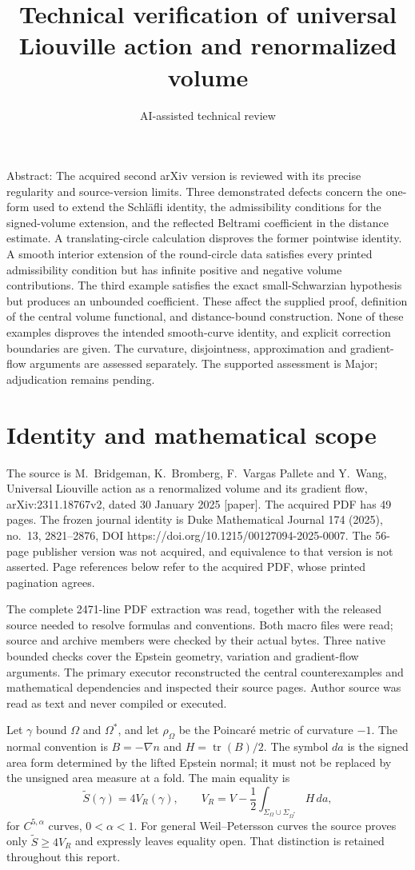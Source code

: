 \documentclass[10pt]{article}
\title{Technical verification of
universal Liouville action and renormalized volume}
\author{AI-assisted technical review}
\date{}
\begin{document}
\maketitle
Abstract: The acquired second arXiv version is reviewed with its precise regularity and source-version limits. Three demonstrated defects concern the one-form used to extend the Schläfli identity, the admissibility conditions for the signed-volume extension, and the reflected Beltrami coefficient in the distance estimate. A translating-circle calculation disproves the former pointwise identity. A smooth interior extension of the round-circle data satisfies every printed admissibility condition but has infinite positive and negative volume contributions. The third example satisfies the exact small-Schwarzian hypothesis but produces an unbounded coefficient. These affect the supplied proof, definition of the central volume functional, and distance-bound construction. None of these examples disproves the intended smooth-curve identity, and explicit correction boundaries are given. The curvature, disjointness, approximation and gradient-flow arguments are assessed separately. The supported assessment is Major; adjudication remains pending.\par
\section*{Identity and mathematical scope}
The source is M. Bridgeman, K. Bromberg, F. Vargas Pallete and Y. Wang, Universal Liouville action as a renormalized volume and its gradient flow, arXiv:2311.18767v2, dated 30 January 2025 [paper]. The acquired PDF has 49 pages. The frozen journal identity is Duke Mathematical Journal 174 (2025), no. 13, 2821–2876, DOI https://doi.org/10.1215/00127094-2025-0007. The 56-page publisher version was not acquired, and equivalence to that version is not asserted. Page references below refer to the acquired PDF, whose printed pagination agrees.\par
The complete 2471-line PDF extraction was read, together with the released source needed to resolve formulas and conventions. Both macro files were read; source and archive members were checked by their actual bytes. Three native bounded checks cover the Epstein geometry, variation and gradient-flow arguments. The primary executor reconstructed the central counterexamples and mathematical dependencies and inspected their source pages. Author source was read as text and never compiled or executed.\par
Let \(\gamma\) bound \(\Omega\) and \(\Omega^*\), and let \(\rho_\Omega\) be the Poincaré metric of curvature \(-1\). The normal convention is \(B=-\nabla n\) and \(H=\operatorname{tr}(B)/2\). The symbol \(da\) is the signed area form determined by the lifted Epstein normal; it must not be replaced by the unsigned area measure at a fold. The main equality is \[\widetilde S(\gamma)=4V_R(\gamma),\qquad
 V_R=V-\frac12\int_{\Sigma_\Omega\cup\Sigma_{\Omega^*}}H\,da ,\] for \(C^{5,\alpha}\) curves, \(0<\alpha<1\). For general Weil–Petersson curves the source proves only \(\widetilde S\geq4V_R\) and expressly leaves equality open. That distinction is retained throughout this report.\par
\end{document}
